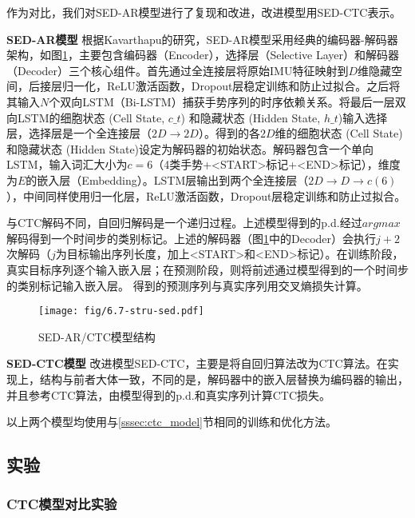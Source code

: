 作为对比，我们对SED-AR模型进行了复现和改进，改进模型用SED-CTC表示。

\textbf{SED-AR模型}\hspace{5pt} 根据Kavarthapu\cites{kavarthapu2017hand}的研究，SED-AR模型采用经典的编码器-解码器架构，如图\ref{fig:6.7-stru-sed}，主要包含编码器（Encoder），选择层（Selective Layer）和解码器（Decoder）三个核心组件。首先通过全连接层将原始IMU特征映射到$D$维隐藏空间，后接层归一化，ReLU激活函数，Dropout层稳定训练和防止过拟合。之后将其输入$N$个双向LSTM（Bi-LSTM）捕获手势序列的时序依赖关系。将最后一层双向LSTM的细胞状态 (Cell State, $c\_t$)	和隐藏状态 (Hidden State, $h\_t$)输入选择层，选择层是一个全连接层（$2D\to2D$）。得到的各$2D$维的细胞状态 (Cell State)和隐藏状态 (Hidden State)设定为解码器的初始状态。解码器包含一个单向LSTM，输入词汇大小为$c=6$（4类手势+<START>标记+<END>标记），维度为$E$的嵌入层（Embedding）。LSTM层输出到两个全连接层（$2D\to D\to c(6)$），中间同样使用归一化层，ReLU激活函数，Dropout层稳定训练和防止过拟合。

与CTC解码不同，自回归解码是一个递归过程。上述模型得到的p.d.经过$argmax$解码得到一个时间步的类别标记。上述的解码器（图\ref{fig:6.7-stru-sed}中的Decoder）会执行$j+2$次解码（$j$为目标输出序列长度，加上<START>和<END>标记）。在训练阶段，真实目标序列逐个输入嵌入层；在预测阶段，则将前述通过模型得到的一个时间步的类别标记输入嵌入层。
得到的预测序列与真实序列用交叉熵损失计算。

\begin{figure}
    \centering
    \texttt{[image: fig/6.7-stru-sed.pdf]}
    \caption{SED-AR/CTC模型结构}
    \label{fig:6.7-stru-sed}
\end{figure}

\textbf{SED-CTC模型}\hspace{5pt} 改进模型SED-CTC，主要是将自回归算法改为CTC算法。在实现上，结构与前者大体一致，不同的是，解码器中的嵌入层替换为编码器的输出，并且参考CTC算法\cites{graves2006connectionist}，由模型得到的p.d.和真实序列计算CTC损失。

以上两个模型均使用与\ref{sssec:ctc_model}节相同的训练和优化方法。

\subsection{实验}

\subsubsection{CTC模型对比实验}


